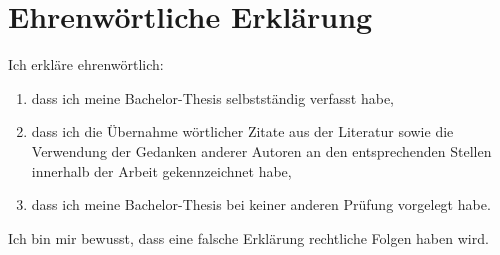 \documentclass[
	12pt, %
	a4paper,
	listof=totoc, %
	bibliography=totoc, %
	numbers=noenddot, %
	ngerman, %
	headsepline, %
	oneside %
	]{scrbook} %
\begin{document}


%







\chapter*{Ehrenwörtliche Erklärung}

\thispagestyle{empty}

Ich erkläre ehrenwörtlich:
\begin{enumerate}
	\item dass ich meine Bachelor-Thesis selbstständig verfasst habe,
	\item dass ich die Übernahme wörtlicher Zitate aus der Literatur sowie die Verwendung der Gedanken anderer Autoren an den entsprechenden Stellen innerhalb der Arbeit gekennzeichnet habe,
	\item dass ich meine Bachelor-Thesis bei keiner anderen Prüfung vorgelegt habe.
\end{enumerate}
Ich bin mir bewusst, dass eine falsche Erklärung rechtliche Folgen haben wird.
\vspace{2cm}
\end{document}
